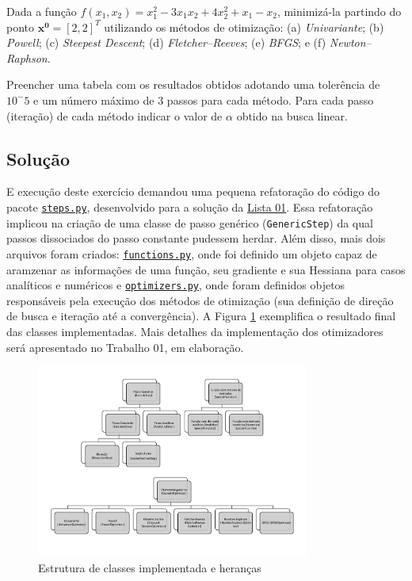 \documentclass[10pt, a4paper]{article}
\begin{document}
Dada a função $f(x_1, x_2) = x_1^2 - 3x_1x_2 + 4x_2^2 + x_1 - x_2$, minimizá-la partindo do ponto $\mathbf{x^0} = [2, 2]^T$ utilizando os métodos de otimização: 
(a) \textit{Univariante}; (b) \textit{Powell}; (c) \textit{Steepest Descent}; 
(d) \textit{Fletcher–Reeves}; (e) \textit{BFGS}; e (f) \textit{Newton–Raphson}.

Preencher uma tabela com os resultados obtidos adotando uma tolerência de $10^-5$ e um número máximo de 3 passos para cada método. Para cada passo (iteração)
de cada método indicar o valor de $\alpha$ obtido na busca linear.


\subsection{Solução}

E execução deste exercício demandou uma pequena refatoração do código do pacote {\tt \href{https://github.com/prj-phcp/MEC2403_Activities/blob/master/packages/steps.py}{steps.py}},
desenvolvido para a solução da \href{https://github.com/prj-phcp/MEC2403_Activities/blob/master/Lista1/Lista1.pdf}{Lista 01}. Essa refatoração implicou na criação de uma 
classe de passo genérico ({\tt GenericStep}) da qual passos dissociados do passo constante pudessem herdar. Além disso, mais dois arquivos foram criados: 
{\tt \href{https://github.com/prj-phcp/MEC2403_Activities/blob/master/packages/functions.py}{functions.py}}, onde foi definido um objeto capaz de aramzenar as informações
de uma função, seu gradiente e sua Hessiana para casos analíticos e numéricos e {\tt \href{https://github.com/prj-phcp/MEC2403_Activities/blob/master/packages/optimizers.py}{optimizers.py}},
onde foram definidos objetos responsáveis pela execução dos métodos de otimização (sua definição de direção de busca e iteração até a convergência). A Figura \ref{fig:q1_1}
exemplifica o resultado final das classes implementadas. Mais detalhes da implementação dos otimizadores será apresentado no Trabalho 01, em elaboração.

\begin{figure}[htpb]
  \centering
  \includegraphics[width=0.8\textwidth]{../general/classes_full.pdf}
  \caption{Estrutura de classes implementada e heranças}
  \label{fig:q1_1}
\end{figure}
\end{document}
